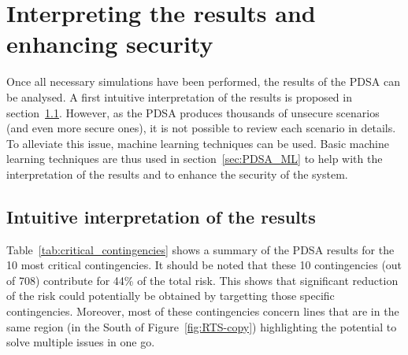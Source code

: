 

\section{Interpreting the results and enhancing security}
\label{sec:PDSA_interpretation}

Once all necessary simulations have been performed, the results of the PDSA can be analysed. A first intuitive interpretation of the results is proposed in section~\ref{sec:PDSA_results_intuitive}. However, as the PDSA produces thousands of unsecure scenarios (and even more secure ones), it is not possible to review each scenario in details. To alleviate this issue, machine learning techniques can be used. Basic machine learning techniques are thus used in section~\ref{sec:PDSA_ML} to help with the interpretation of the results and to enhance the security of the system.

\subsection{Intuitive interpretation of the results}
\label{sec:PDSA_results_intuitive}

Table~\ref{tab:critical_contingencies} shows a summary of the PDSA results for the 10 most critical contingencies. It should be noted that these 10 contingencies (out of 708) contribute for 44\% of the total risk. This shows that significant reduction of the risk could potentially be obtained by targetting those specific contingencies. Moreover, most of these contingencies concern lines that are in the same region (in the South of Figure~\ref{fig:RTS-copy}) highlighting the potential to solve multiple issues in one go.

